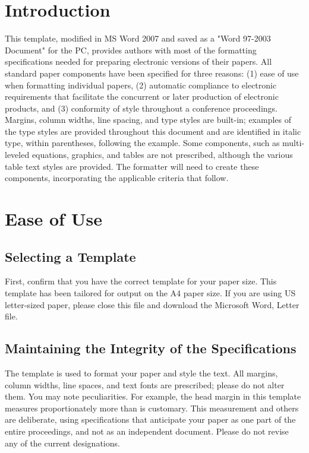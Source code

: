 \documentclass[10pt, conference, compsocconf]{IEEEtran}
\begin{document}
\section{Introduction}
This template, modified in MS Word 2007 and saved as a "Word 97-2003 Document" for the PC, provides authors with most of the formatting specifications needed for preparing electronic versions of their papers. All standard paper components have been specified for three reasons: (1) ease of use when formatting individual papers, (2) automatic compliance to electronic requirements that facilitate the concurrent or later production of electronic products, and (3) conformity of style throughout a conference proceedings. Margins, column widths, line spacing, and type styles are built-in; examples of the type styles are provided throughout this document and are identified in italic type, within parentheses, following the example. Some components, such as multi-leveled equations, graphics, and tables are not prescribed, although the various table text styles are provided. The formatter will need to create these components, incorporating the applicable criteria that follow.

\section{Ease of Use}
\subsection{Selecting a Template}
First, confirm that you have the correct template for your paper size. This template has been tailored for output on the A4 paper size. If you are using US letter-sized paper, please close this file and download the Microsoft Word, Letter file.

\subsection{Maintaining the Integrity of the Specifications}
The template is used to format your paper and style the text. All margins, column widths, line spaces, and text fonts are prescribed; please do not alter them. You may note peculiarities. For example, the head margin in this template measures proportionately more than is customary. This measurement and others are deliberate, using specifications that anticipate your paper as one part of the entire proceedings, and not as an independent document. Please do not revise any of the current designations.
\end{document}
